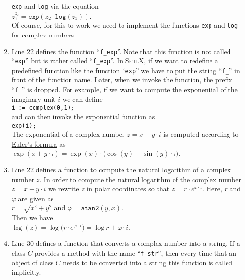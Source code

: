 \begin{enumerate}
      \texttt{exp} and \texttt{log} via the equation
      \\[0.2cm]
      \hspace*{1.3cm}
      $z_1^{z_2} = \mathtt{exp}(z_2 \cdot \mathtt{log}(z_1))$.
      \\[0.2cm]
      Of course, for this to work we need to implement the functions \texttt{exp} and
      \texttt{log} for complex numbers.
\item Line 22 defines the function ``\texttt{f\_exp}''.  Note that this function is not
      called ``\texttt{exp}'' but is rather called ``\texttt{f\_exp}''.  In
      \textsc{SetlX}, if we want to redefine a predefined function like the function
      ``\texttt{exp}'' we have to put the string ``\texttt{f\_}'' in front of the function
      name.  Later, when we invoke the function, the prefix ``\texttt{f\_}'' is dropped.
      For example, if we want to compute the exponential of the imaginary unit $i$ we can
      define
      \\[0.2cm]
      \hspace*{1.3cm}
      \texttt{i := complex(0,1);}
      \\[0.2cm]
      and can then invoke the exponential function as
      \\[0.2cm]
      \hspace*{1.3cm}
      \texttt{exp(i);}
      \\[0.2cm]
      The exponential of a complex number $z = x + y \cdot i$ is computed according to
      \href{http://en.wikipedia.org/wiki/Euler%27s_formula}{Euler's formula} as
      \\[0.2cm]
      \hspace*{1.3cm}
      $\exp(x + y \cdot i) = \exp(x) \cdot \bigl(\cos(y) + \sin(y) \cdot i\bigr)$.
\item Line 22 defines a function to compute the natural logarithm of a complex number $z$.
      In order to compute the natural logarithm of the complex number $z = x + y \cdot i$ we rewrite $z$
      in polar coordinates so that $z = r \cdot e^{\varphi \cdot i}$.   Here, $r$ and
      $\varphi$ are given as
      \\[0.2cm]
      \hspace*{1.3cm}
      $r = \sqrt{x^2 + y^2}$ \quad and \quad $\varphi = \mathtt{atan2}(y, x)$.
      \\[0.2cm]
      Then we have
      \\[0.2cm]
      \hspace*{1.3cm}
      $\log(z) = \log\bigl(r \cdot e^{\varphi \cdot i}\bigr) = \log r + \varphi \cdot i$.
\item Line 30 defines a function that converts a complex number into a string.  If a class
      $C$ provides a method with the name ``\texttt{f\_str}'', then every time that an object
      of class $C$ needs to be converted into a string this function is called implicitly.


\end{enumerate}
